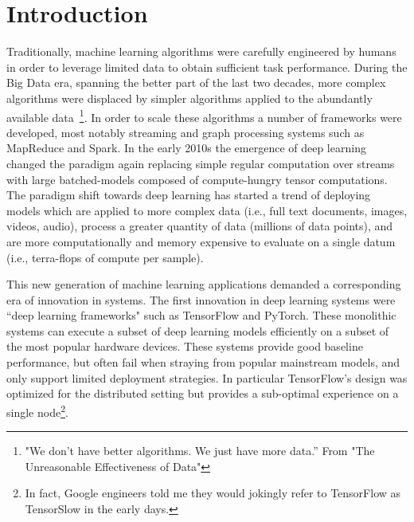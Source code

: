 \chapter{Introduction}
\label{ch:intro}

Traditionally, machine learning algorithms were carefully engineered by humans
  in order to leverage limited data to obtain sufficient task performance.
During the Big Data era, spanning the better part of the last two decades,
  more complex algorithms were displaced by
  simpler algorithms applied to the abundantly available data~\citep{unreasonable}\footnote{"We don’t have better algorithms. We just have more data.” From "The Unreasonable Effectiveness of Data"}.
In order to scale these algorithms a number of frameworks were
  developed, most notably streaming and graph processing systems such as MapReduce and Spark.
In the early 2010s the emergence of deep learning changed the paradigm again
  replacing simple regular computation over streams with large batched-models
  composed of compute-hungry tensor computations.
The paradigm shift towards deep learning has started a trend of deploying models
  which are applied to more complex data (i.e., full text documents, images, videos, audio),
  process a greater quantity of data (millions of data points),
  and are more computationally and memory expensive to evaluate on a single datum (i.e., terra-flops of compute per sample).

This new generation of machine learning applications demanded a corresponding era of
  innovation in systems.
The first innovation in deep learning systems were
  ``deep learning frameworks" such as TensorFlow and PyTorch.
These monolithic systems can execute a subset of deep learning models
  efficiently on a subset of the most popular hardware devices.
These systems provide good baseline performance, but often fail
  when straying from popular mainstream models, and only support limited deployment strategies.
In particular TensorFlow's design was optimized for the distributed setting
  but provides a sub-optimal experience on a single node\footnote{In fact, Google engineers told me they would jokingly refer to TensorFlow as TensorSlow in the early days.}.

